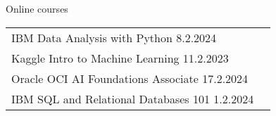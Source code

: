 \documentclass{resume} %
\begin{document}
\begin{rSection}{Online courses}
\begin{tabular}{ll}
IBM \hspace{3em} Data Analysis with Python  \hspace{28em} 8.2.2024 \\
Kaggle \hspace{2em} Intro to Machine Learning \hfill 11.2.2023 \\
Oracle \hspace{2em} OCI AI Foundations Associate \hfill 17.2.2024 \\
IBM \hspace{3em} SQL and Relational Databases 101 \hfill 1.2.2024
\end{tabular}

\end{rSection}
\end{document}
